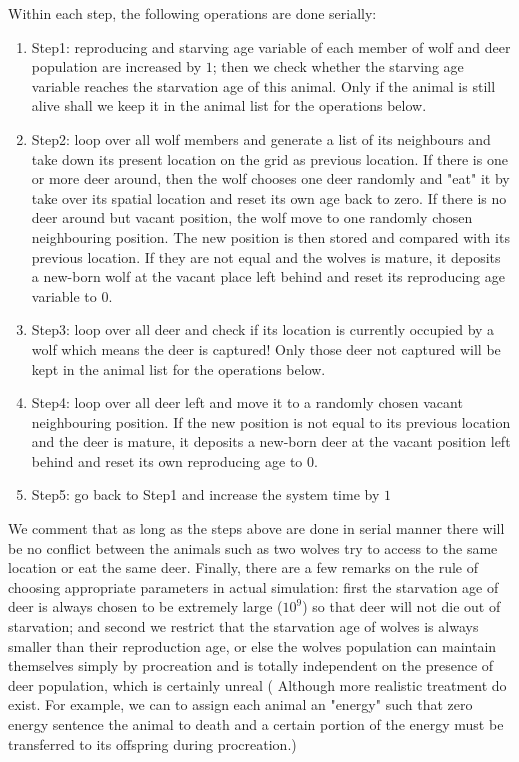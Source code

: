 \documentclass[a4paper,12pt]{article}
\begin{document}
Within each step, the following operations are done serially: 
\begin{enumerate}
\item Step1: reproducing and starving age variable of each member of wolf and deer population are increased by $1$; then we check whether the starving age variable reaches the starvation age of this animal. Only if the animal is still alive shall we keep it in the animal list for the operations below.
\item Step2: loop over all wolf members and generate a list of its neighbours and take down its present location on the grid as previous location. If there is one or more deer around, then the wolf chooses one deer randomly and "eat" it by take over its spatial location and reset its own age back to zero. If there is no deer around but vacant position, the wolf move to one randomly chosen neighbouring position. The new position is then stored and compared with its previous location. If they are not equal and the wolves is mature, it deposits a new-born wolf at the vacant place left behind and reset its reproducing age variable to 0.
\item Step3: loop over all deer and check if its location is currently occupied by a wolf which means the deer is captured! Only those deer not captured will be kept in the animal list for the operations below.
\item Step4: loop over all deer left and move it to a randomly chosen vacant neighbouring position. If the new position is not equal to its previous location and the deer is mature, it deposits a new-born deer at the vacant position left behind and reset its own reproducing age to 0.
\item Step5: go back to Step1 and increase the system time by $1$
\end{enumerate}

We comment that as long as the steps above are done in serial manner there will be no conflict between the animals such as two wolves try to access to the same location or eat the same deer. Finally, there are a few remarks on the rule of choosing appropriate parameters in actual simulation: first the starvation age of deer is always chosen to be extremely large ($10^9$) so that deer will not die out of starvation; and second we restrict that the starvation age of wolves is always smaller than their reproduction age, or else the wolves population can maintain themselves simply by procreation and is totally independent on the presence of deer population, which is certainly unreal ( Although more realistic treatment do exist. For example, we can to assign each animal an "energy" such that zero energy sentence the animal to death and a certain portion of the energy must be transferred to its offspring during procreation.)
\end{document}
